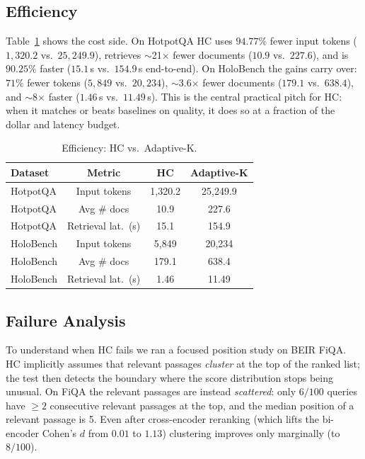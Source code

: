 \documentclass[letterpaper]{article}
\newcommand{\HotTokHC}{1{,}320.2}
\newcommand{\HotTokAdaK}{25{,}249.9}
\newcommand{\HotDocsHC}{10.9}
\newcommand{\HotDocsAdaK}{227.6}
\newcommand{\HotLatHC}{15.1}
\newcommand{\HotLatAdaK}{154.9}
\newcommand{\HolTokHC}{5{,}849}
\newcommand{\HolTokAdaK}{20{,}234}
\newcommand{\HolDocsHC}{179.1}
\newcommand{\HolDocsAdaK}{638.4}
\newcommand{\HolLatHC}{1.46}
\newcommand{\HolLatAdaK}{11.49}
\begin{document}
\subsection{Efficiency}
Table~\ref{tab:eff} shows the cost side. On HotpotQA HC uses
$94.77\%$ fewer input tokens ($\HotTokHC$ vs.\ $\HotTokAdaK$),
retrieves $\sim$21$\times$ fewer documents ($\HotDocsHC$ vs.\
$\HotDocsAdaK$), and is $90.25\%$ faster ($\HotLatHC$\,s vs.\
$\HotLatAdaK$\,s end-to-end). On HoloBench the gains carry over:
$71\%$ fewer tokens ($\HolTokHC$ vs.\ $\HolTokAdaK$), $\sim$3.6$\times$
fewer documents ($\HolDocsHC$ vs.\ $\HolDocsAdaK$), and $\sim$8$\times$
faster ($\HolLatHC$\,s vs.\ $\HolLatAdaK$\,s). This is the central
practical pitch for HC: when it matches or beats baselines on quality,
it does so at a fraction of the dollar and latency budget.

\begin{table}[t]
\centering
\small
\begin{tabular}{lccc}
\hline
Dataset & Metric & HC & Adaptive-K \\
\hline
HotpotQA  & Input tokens     & \HotTokHC  & \HotTokAdaK \\
HotpotQA  & Avg \# docs      & \HotDocsHC & \HotDocsAdaK \\
HotpotQA  & Retrieval lat.\ (s) & \HotLatHC  & \HotLatAdaK \\
\hline
HoloBench & Input tokens     & \HolTokHC  & \HolTokAdaK \\
HoloBench & Avg \# docs      & \HolDocsHC & \HolDocsAdaK \\
HoloBench & Retrieval lat.\ (s) & \HolLatHC  & \HolLatAdaK \\
\hline
\end{tabular}
\caption{Efficiency: HC vs.\ Adaptive-K.}
\label{tab:eff}
\end{table}

\subsection{Failure Analysis}
\label{sec:failure}
To understand when HC fails we ran a focused position study on BEIR
FiQA. HC implicitly assumes that relevant passages \emph{cluster} at
the top of the ranked list; the test then detects the boundary where
the score distribution stops being unusual. On FiQA the relevant
passages are instead \emph{scattered}: only $6/100$ queries have
$\ge 2$ consecutive relevant passages at the top, and the median
position of a relevant passage is 5. Even after cross-encoder
reranking (which lifts the bi-encoder Cohen's $d$ from $0.01$ to
$1.13$) clustering improves only marginally (to $8/100$).
\end{document}
